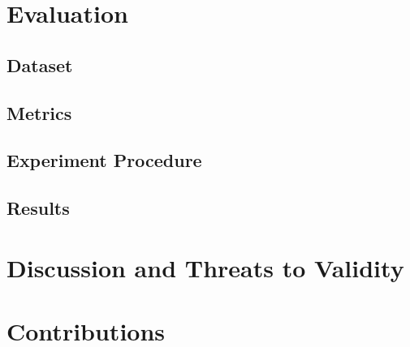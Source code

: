\documentclass[conference]{IEEEtran}
\begin{document}
\section{Evaluation}
\label{sec:evaluation}

\subsection{Dataset}
\label{sec:dataset}

\subsection{Metrics}
\label{sec:metrics}

\subsection{Experiment Procedure}
\label{sec:experiment-procedure}

\subsection{Results}
\label{sec:results}

\section{Discussion and Threats to Validity}
\label{sec:dicussion}

\section{Contributions}
\label{sec:contributions}

% 
% 
\end{document}
